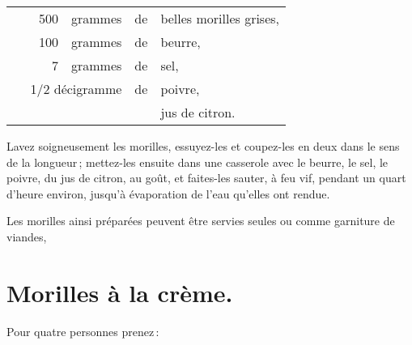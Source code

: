 \footnotesize
\begin{longtable}{rrrrrp{18em}}
  & \hspace{2em} & 500 & grammes & de & belles morilles grises,                                           \\
  & \hspace{2em} & 100 & grammes & de & beurre,                                                           \\
  & \hspace{2em} &   7 & grammes & de & sel,                                                              \\
  & \multicolumn{3}{r}{1/2 décigramme} & de & poivre,                                                     \\
  & \hspace{2em} &     &         &    & jus de citron.                                                    \\
\end{longtable}
\normalsize

Lavez soigneusement les morilles, essuyez-les et coupez-les en deux dans le
sens de la longueur ; mettez-les ensuite dans une casserole avec le beurre, le
sel, le poivre, du jus de citron, au goût, et faites-les sauter, à feu vif,
pendant un quart d'heure environ, jusqu'à évaporation de l'eau qu'elles ont
rendue.

\medskip

Les morilles ainsi préparées peuvent être servies seules ou comme garniture de
viandes,

\section*{\centering Morilles à la crème.}
{}

Pour quatre personnes prenez :

